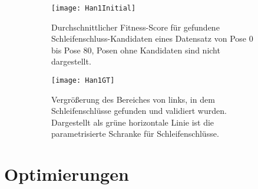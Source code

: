 \begin{figure}
	\centering
	\begin{subfigure}{.5\textwidth}
		 \centering
  		 \texttt{[image: Han1Initial]}
  		 \centering \caption{Durchschnittlicher Fitness-Score für gefundene Schleifenschluss-Kandidaten eines Datensatz von Pose $0$ bis Pose $80$, Posen ohne Kandidaten sind nicht dargestellt.}
  		 \label{fig:Han1Initial}
	\end{subfigure}%
	\begin{subfigure}{.5\textwidth}
    	\centering
  		\texttt{[image: Han1GT]}
  		\centering \caption{Vergrößerung des Bereiches von links, in dem Schleifenschlüsse gefunden und validiert wurden. Dargestellt als grüne horizontale Linie ist die parametrisierte Schranke für Schleifenschlüsse.}
  		\label{fig:Han1GT}
	\end{subfigure}
	\caption{}
	\label{fig:Windows}
\end{figure}

\section{Optimierungen}





